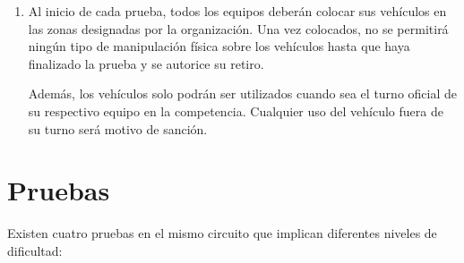 \documentclass[letterpaper,12pt]{article}
\begin{document}
\begin{enumerate}
\item Al inicio de cada prueba, todos los equipos deberán colocar sus vehículos en las zonas designadas por la organización. Una vez colocados, no se permitirá ningún tipo de manipulación física sobre los vehículos hasta que haya finalizado la prueba y se autorice su retiro.

Además, los vehículos solo podrán ser utilizados cuando sea el turno oficial de su respectivo equipo en la competencia. Cualquier uso del vehículo fuera de su turno será motivo de sanción.

\end{enumerate}

\section{Pruebas}
Existen cuatro pruebas en el mismo circuito que implican diferentes niveles de dificultad:
\end{document}
